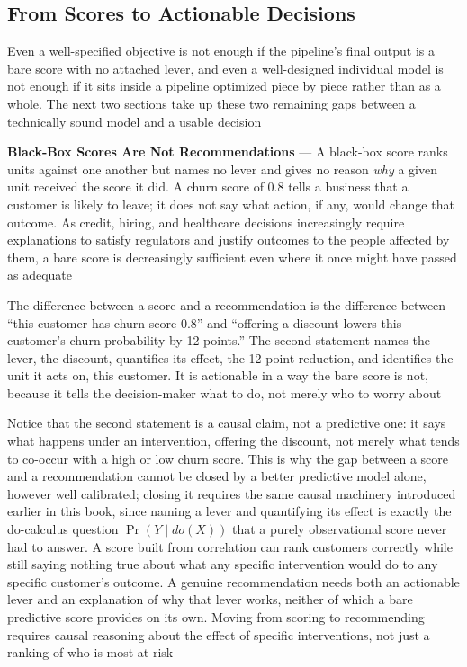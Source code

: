 \subsection{From Scores to Actionable Decisions}
\label{sec:scores-to-actionable-decisions}

Even a well-specified objective is not enough if the pipeline's final output is
a bare score with no attached lever, and even a well-designed individual model is
not enough if it sits inside a pipeline optimized piece by piece rather than as a
whole. The next two sections take up these two remaining gaps between a
technically sound model and a usable decision

\textbf{Black-Box Scores Are Not Recommendations} --- A black-box score ranks
units against one another but names no lever and gives no reason \emph{why} a given
unit received the score it did. A churn score of 0.8 tells a business that a
customer is likely to leave; it does not say what action, if any, would change that
outcome. As credit, hiring, and healthcare decisions increasingly require
explanations to satisfy regulators and justify outcomes to the people affected
by them, a bare score is decreasingly sufficient even where it once might have passed
as adequate

The difference between a score and a recommendation is the difference between ``this
customer has churn score 0.8'' and ``offering a discount lowers this customer's
churn probability by 12 points.'' The second statement names the lever, the
discount, quantifies its effect, the 12-point reduction, and identifies the unit
it acts on, this customer. It is actionable in a way the bare score is not,
because it tells the decision-maker what to do, not merely who to worry about

Notice that the second statement is a causal claim, not a predictive one: it
says what happens under an intervention, offering the discount, not merely what
tends to co-occur with a high or low churn score. This is why the gap between a score
and a recommendation cannot be closed by a better predictive model alone,
however well calibrated; closing it requires the same causal machinery introduced
earlier in this book, since naming a lever and quantifying its effect is exactly
the do-calculus question $\Pr(Y \mid do(X))$ that a purely observational score
never had to answer. A score built from correlation can rank customers correctly
while still saying nothing true about what any specific intervention would do to
any specific customer's outcome. A genuine recommendation needs both an
actionable lever and an explanation of why that lever works, neither of which a bare
predictive score provides on its own. Moving from scoring to recommending
requires causal reasoning about the effect of specific interventions, not just a
ranking of who is most at risk

